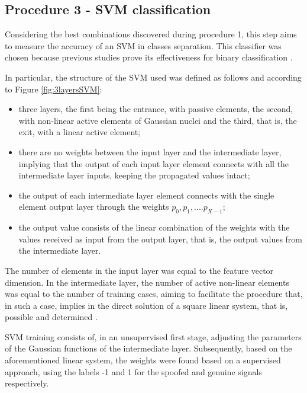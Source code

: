 		\subsection{Procedure 3 - SVM classification}
			\label{sec:propApproach:subsec:Experiment3}

			\par Considering the best combinations discovered during procedure 1, this step aims to measure the accuracy of an SVM in classes separation. This classifier was chosen because previous studies prove its effectiveness for binary classification \cite{bennett2000support}. 
			
			\par In particular, the structure of the SVM used was defined as follows and according to Figure \ref{fig:3layersSVM}: 
			\begin{itemize}
				\item three layers, the first being the entrance, with passive elements, the second, with non-linear active elements of Gaussian nuclei and the third, that is, the exit, with a linear active element;

				\item there are no weights between the input layer and the intermediate layer, implying that the output of each input layer element connects with all the intermediate layer inputs, keeping the propagated values intact;
				
				\item the output of each intermediate layer element connects with the single element output layer through the weights $p_0, p_1, .... p_{X-1}$;

				\item the output value consists of the linear combination of the weights with the values received as input from the output layer, that is, the output values from the intermediate layer.
			\end{itemize}
			
			
			
			\par The number of elements in the input layer was equal to the feature vector dimension. In the intermediate layer, the number of active non-linear elements was equal to the number of training cases, aiming to facilitate the procedure that, in such a case, implies in the direct solution of a square linear system, that is, possible and determined \cite{poole2014linear}. 
			
			\par SVM training consists of, in an unsupervised first stage, adjusting the parameters of the Gaussian functions of the intermediate layer. Subsequently, based on the aforementioned linear system, the weights were found based on a supervised approach, using the labels -1 and 1 for the spoofed and genuine signals respectively.   
			
